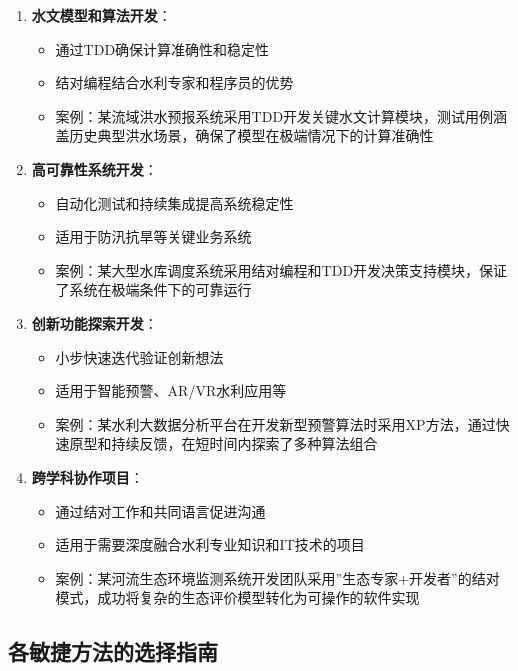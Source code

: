 \begin{enumerate}
\def\labelenumi{\arabic{enumi}.}
\tightlist
\item
  \textbf{水文模型和算法开发}：

  \begin{itemize}
  \tightlist
  \item
    通过TDD确保计算准确性和稳定性
  \item
    结对编程结合水利专家和程序员的优势
  \item
    案例：某流域洪水预报系统采用TDD开发关键水文计算模块，测试用例涵盖历史典型洪水场景，确保了模型在极端情况下的计算准确性
  \end{itemize}
\item
  \textbf{高可靠性系统开发}：

  \begin{itemize}
  \tightlist
  \item
    自动化测试和持续集成提高系统稳定性
  \item
    适用于防汛抗旱等关键业务系统
  \item
    案例：某大型水库调度系统采用结对编程和TDD开发决策支持模块，保证了系统在极端条件下的可靠运行
  \end{itemize}
\item
  \textbf{创新功能探索开发}：

  \begin{itemize}
  \tightlist
  \item
    小步快速迭代验证创新想法
  \item
    适用于智能预警、AR/VR水利应用等
  \item
    案例：某水利大数据分析平台在开发新型预警算法时采用XP方法，通过快速原型和持续反馈，在短时间内探索了多种算法组合
  \end{itemize}
\item
  \textbf{跨学科协作项目}：

  \begin{itemize}
  \tightlist
  \item
    通过结对工作和共同语言促进沟通
  \item
    适用于需要深度融合水利专业知识和IT技术的项目
  \item
    案例：某河流生态环境监测系统开发团队采用''生态专家+开发者''的结对模式，成功将复杂的生态评价模型转化为可操作的软件实现
  \end{itemize}
\end{enumerate}

\subsection{各敏捷方法的选择指南}\label{ux5404ux654fux6377ux65b9ux6cd5ux7684ux9009ux62e9ux6307ux5357}

